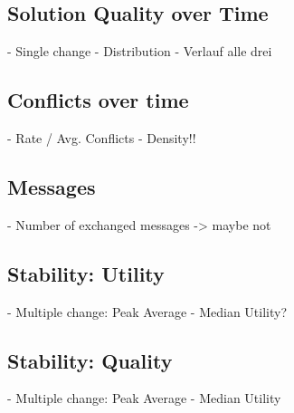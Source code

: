 \subsection{Solution Quality over Time}
- Single change
- Distribution
- Verlauf alle drei
\subsection{Conflicts over time}
- Rate / Avg. Conflicts - Density!!
\subsection{Messages}
- Number of exchanged messages -> maybe not
\subsection{Stability: Utility}
- Multiple change: Peak Average
- Median Utility?
\subsection{Stability: Quality}
- Multiple change: Peak Average
- Median Utility


